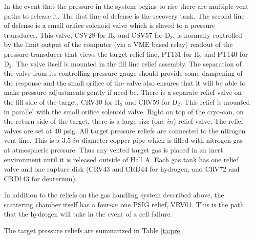 {\begin{safetyen}{10}{5}
In the event that the pressure in the system begins to rise there are multiple
vent paths to release it. The first line of defense is the recovery tank.
The second line of defense is a small orifice solenoid valve
which is slaved to a pressure transducer. This valve, CSV28 for H$_2$ and
CSV57 for D$_2$, 
is normally controlled by the limit
output of the computer (via a VME based relay) readout of
the pressure transducer that views the target
relief line, PT131 for H$_2$ and PT140 for D$_2$. The valve itself is mounted
in the fill line relief assembly. The separation of the valve from its
controlling pressure gauge should provide some dampening of the response
and the small orifice of the valve also ensures that it will
be able to make pressure adjustments gently if need be.
There is 
a separate relief valve on the fill side of the target, CRV30 for H$_2$ and
CRV59 for D$_2$. This relief is mounted in parallel with the small orifice 
solenoid valve. Right on top of the cryo-can, on the return side of the target,
there is a large size (one $in$) relief valve. The relief valves are set at 
40 psig.
All target pressure reliefs are connected to the
nitrogen vent line.
This is a 3.5 $in$ diameter 
copper pipe which is filled with nitrogen gas at atmospheric pressure.
Thus any vented target gas is placed in an inert environment until it is
released outside of Hall A. Each gas tank has one relief valve and one rupture
disk (CRV43 and CRD44 for hydrogen, and CRV72 and CRD143 for deuterium).
 
In addition to the reliefs on the gas handling system described above, the
scattering chamber itself has a four-$in$ one PSIG relief, VRV01.
This is the path that the
hydrogen will take in the event of a cell failure.   

The target pressure reliefs are summarized in Table \ref{ta:pre}.


\end{safetyen}}
